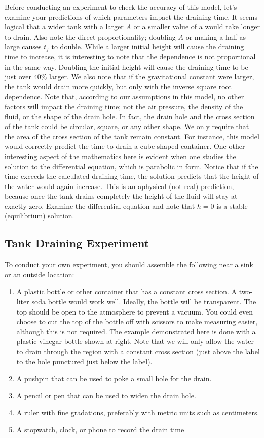 \documentclass{ximera}
\begin{document}
Before conducting an experiment to check the accuracy of this model, let’s examine your predictions of which parameters impact the draining time.  It seems logical that a wider tank with a larger $A$ or a smaller value of a would take longer to drain.  Also note the direct proportionality; doubling $A$ or making a half as large causes $t_f$ to double.  While a larger initial height will cause the draining time to increase, it is interesting to note that the dependence is not proportional in the same way.  Doubling the initial height will cause the draining time to be just over $40\%$ larger.  We also note that if the gravitational constant were larger, the tank would drain more quickly, but only with the inverse square root dependence.  Note that, according to our assumptions in this model, no other factors will impact the draining time; not the air pressure, the density of the fluid, or the shape of the drain hole.  In fact, the drain hole and the cross section of the tank could be circular, square, or any other shape.  We only require that the area of the cross section of the tank remain constant.  For instance, this model would correctly predict the time to drain a cube shaped container.
One other interesting aspect of the mathematics here is evident when one studies the solution to the differential equation, which is parabolic in form.  Notice that if the time exceeds the calculated draining time, the solution predicts that the height of the water would again increase.  This is an aphysical (not real) prediction, because once the tank drains completely the height of the fluid will stay at exactly zero.  Examine the differential equation and note that $h=0$ is a stable (equilibrium) solution.

\subsection*{Tank Draining Experiment}

To conduct your own experiment, you should assemble the following near a sink or an outside location: 
\begin{enumerate}
\item
A plastic bottle or other container that has a constant cross section.  A two-liter soda bottle would work well.  Ideally, the bottle will be transparent.  The top should be open to the atmosphere to prevent a vacuum.  You could even choose to cut the top of the bottle off with scissors to make measuring easier, although this is not required.  The example demonstrated here is done with a plastic vinegar bottle shown at right.  Note that we will only allow the water to drain through the region with a constant cross section (just above the label to the hole punctured just below the label).
\item
A pushpin that can be used to poke a small hole for the drain.
\item
A pencil or pen that can be used to widen the drain hole.
\item
A ruler with fine gradations, preferably with metric units such as centimeters.
\item
A stopwatch, clock, or phone to record the drain time
\end{enumerate}
\end{document}
